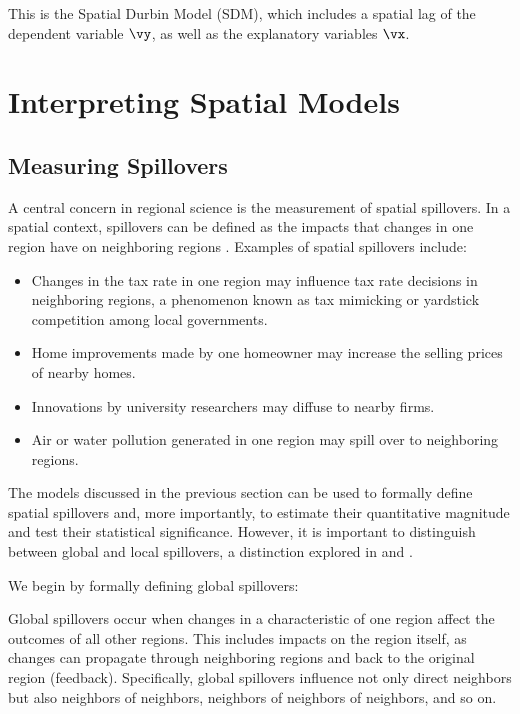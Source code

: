 \documentclass[english,12pt]{book}\usepackage[]{graphicx}\usepackage[]{xcolor}
\begin{document}
This is the Spatial Durbin Model (SDM), which includes a spatial lag of the dependent variable $\vy$, as well as the explanatory variables $\vx$.


\section{Interpreting Spatial Models}\label{sec:interpretation}

\subsection{Measuring Spillovers}

A central concern in regional science is the measurement of spatial spillovers. In a spatial context, spillovers can be defined as the impacts that changes in one region have on neighboring regions \citep{LeSage2014}. Examples of spatial spillovers include:
\begin{itemize}
  \item Changes in the tax rate in one region may influence tax rate decisions in neighboring regions, a phenomenon known as tax mimicking or yardstick competition among local governments. 
  \item Home improvements made by one homeowner may increase the selling prices of nearby homes.
  \item Innovations by university researchers may diffuse to nearby firms. 
  \item Air or water pollution generated in one region may spill over to neighboring regions.  
\end{itemize}

The models discussed in the previous section can be used to formally define spatial spillovers and, more importantly, to estimate their quantitative magnitude and test their statistical significance. However, it is important to distinguish between global and local spillovers, a distinction explored in \cite{anselin2003spatial} and \cite{LeSage2014}.

We begin by formally defining global spillovers:
\begin{definition}
	 Global spillovers occur when changes in a characteristic of one region affect the outcomes of all other regions. This includes impacts on the region itself, as changes can propagate through neighboring regions and back to the original region (feedback). Specifically, global spillovers influence not only direct neighbors but also neighbors of neighbors, neighbors of neighbors of neighbors, and so on. 
\end{definition}
\end{document}
